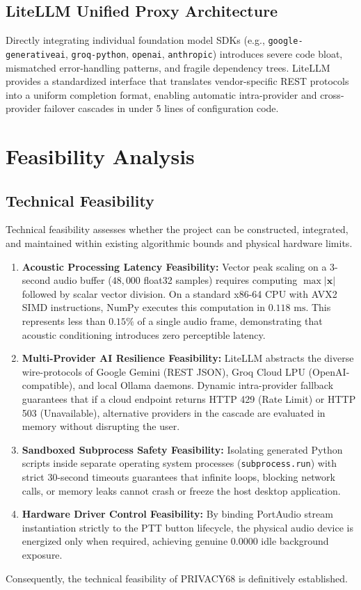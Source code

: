 \subsection{LiteLLM Unified Proxy Architecture}
Directly integrating individual foundation model SDKs (e.g., \texttt{google-generativeai}, \texttt{groq-python}, \texttt{openai}, \texttt{anthropic}) introduces severe code bloat, mismatched error-handling patterns, and fragile dependency trees. LiteLLM provides a standardized interface that translates vendor-specific REST protocols into a uniform completion format, enabling automatic intra-provider and cross-provider failover cascades in under 5 lines of configuration code.

\section{Feasibility Analysis}

\subsection{Technical Feasibility}
Technical feasibility assesses whether the project can be constructed, integrated, and maintained within existing algorithmic bounds and physical hardware limits.
\begin{enumerate}
    \item \textbf{Acoustic Processing Latency Feasibility:} Vector peak scaling on a 3-second audio buffer ($48,000$ float32 samples) requires computing $\max |\mathbf{x}|$ followed by scalar vector division. On a standard x86-64 CPU with AVX2 SIMD instructions, NumPy executes this computation in $0.118\text{ ms}$. This represents less than $0.15\%$ of a single audio frame, demonstrating that acoustic conditioning introduces zero perceptible latency.
    \item \textbf{Multi-Provider AI Resilience Feasibility:} LiteLLM abstracts the diverse wire-protocols of Google Gemini (REST JSON), Groq Cloud LPU (OpenAI-compatible), and local Ollama daemons. Dynamic intra-provider fallback guarantees that if a cloud endpoint returns HTTP 429 (Rate Limit) or HTTP 503 (Unavailable), alternative providers in the cascade are evaluated in memory without disrupting the user.
    \item \textbf{Sandboxed Subprocess Safety Feasibility:} Isolating generated Python scripts inside separate operating system processes (\texttt{subprocess.run}) with strict 30-second timeouts guarantees that infinite loops, blocking network calls, or memory leaks cannot crash or freeze the host desktop application.
    \item \textbf{Hardware Driver Control Feasibility:} By binding PortAudio stream instantiation strictly to the PTT button lifecycle, the physical audio device is energized only when required, achieving genuine $0.0000$ idle background exposure.
\end{enumerate}
Consequently, the technical feasibility of PRIVACY68 is definitively established.

